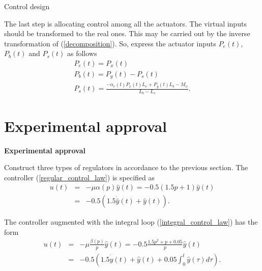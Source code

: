 \documentclass[10pt,pdf,hyperref={unicode}]{beamer}
\begin{document}
\begin{frame}{Control design}

The last step is allocating control among all the actuators. The virtual inputs should be transformed to the real ones. This may be carried out by the inverse transformation of (\ref{decomposition}). So, express the actuator inputs $P_e(t)$, $P_b(t)$ and $P_s(t)$ as follows
\begin{eqnarray}
&P_e(t)=P_x(t)&\\
&P_b(t)=P_y(t)-P_s(t)&\\
&P_s(t)=\frac{-\alpha_e(t) P_x(t)L_e+P_y(t)L_b-M_\psi}{L_b-L_s}.&
\end{eqnarray}

\end{frame}

\section{Experimental approval}

\begin{frame}

\begin{center}
	{\Large \textbf {Experimental approval}\\}
\end{center}

Construct three types of regulators in accordance to the previous section. The controller (\ref{regular_control_law}) is specified as
\begin{eqnarray}
\label{regular_control_law_experiment}
u(t)&=&-\mu\alpha(p)\hat y(t)=-0.5(1.5p+1)\hat y(t)\nonumber\\
&=&-0.5(1.5\dot{\hat y}(t)+\hat y(t)).
\end{eqnarray}

The controller augmented with the integral loop (\ref{integral_control_law}) has the form
\begin{eqnarray}
\label{integral_control_law_experiment}
u(t)&=&-\mu\frac{\beta(p)}{p}\hat y(t)=-0.5\frac{1.5p^2+p+0.05}{p}\hat y(t)\nonumber\\
&=&-0.5\left(1.5\dot{\hat y}(t)+\hat y(t)+0.05\int_0^t\hat y(\tau)d\tau\right).
\end{eqnarray}

\end{frame}
\end{document}
